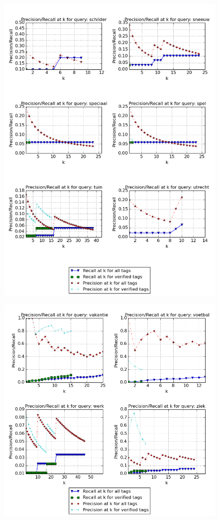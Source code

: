 \begin{figure}[H]
\centering
\includegraphics[width=\textwidth]{appendixd/queries-schilder}
\end{figure}


\begin{figure}[H]
\centering
\includegraphics[width=\textwidth]{appendixd/queries-vakantie}
\end{figure}